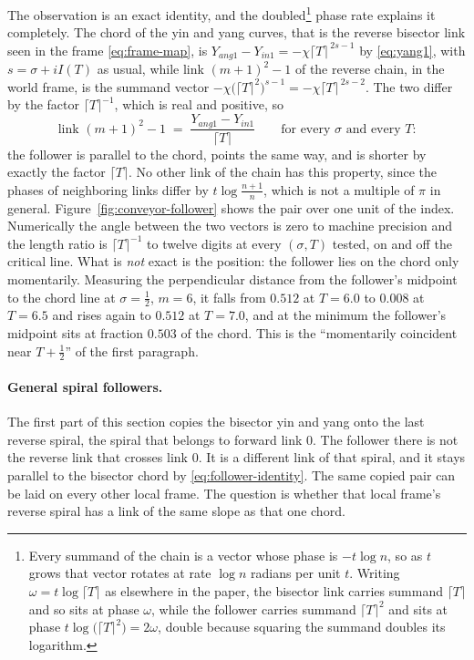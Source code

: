 \documentclass[11pt]{article}
\theoremstyle{definition}
\begin{document}
The observation is an exact identity, and the doubled\footnote{Every summand
of the chain is a vector whose phase is $-t\log n$, so as $t$ grows that
vector rotates at rate $\log n$ radians per unit $t$. Writing
$\omega=t\log\lceil T\rceil$ as elsewhere in the paper, the bisector link
carries summand $\lceil T\rceil$ and so sits at phase $\omega$, while the
follower carries summand $\lceil T\rceil^{2}$ and sits at phase
$t\log\bigl(\lceil T\rceil^{2}\bigr)=2\omega$, double because squaring the
summand doubles its logarithm.} phase rate explains it
completely. The chord of the yin and yang curves, that is the reverse bisector link
seen in the frame \eqref{eq:frame-map}, is
$Y_{ang1}-Y_{in1}=-\chi\lceil T\rceil^{\,2s-1}$ by \eqref{eq:yang1}, with
$s=\sigma+iI(T)$ as usual, while
link $(m+1)^{2}-1$ of the reverse chain, in the world frame, is the summand
vector $-\chi\bigl(\lceil T\rceil^{2}\bigr)^{s-1}=-\chi\lceil
T\rceil^{\,2s-2}$. The two differ by the factor $\lceil T\rceil^{-1}$, which
is real and positive, so
\begin{equation}\label{eq:follower-identity}
\text{link }(m+1)^2-1 \;=\; \frac{Y_{ang1}-Y_{in1}}{\lceil T\rceil}
\qquad\text{for every }\sigma\text{ and every $T$:}
\end{equation}
the follower is parallel to the chord, points the same way, and is shorter by
exactly the factor $\lceil T\rceil$. No other link of the chain has this
property, since the phases of neighboring links differ by
$t\log\frac{n+1}{n}$, which is not a multiple of $\pi$ in general.
Figure~\ref{fig:conveyor-follower} shows the pair over one unit of the index.
Numerically the angle between the two vectors is zero to machine precision and
the length ratio is $\lceil T\rceil^{-1}$ to twelve digits at every
$(\sigma,T)$ tested, on and off the critical line. What is \emph{not} exact is
the position: the follower lies on the chord only momentarily. Measuring the
perpendicular distance from the follower's midpoint to the chord line at
$\sigma=\tfrac12$, $m=6$, it falls from $0.512$ at $T=6.0$ to $0.008$ at
$T=6.5$ and rises again to $0.512$ at $T=7.0$, and at the minimum the
follower's midpoint sits at fraction $0.503$ of the chord. This is the
``momentarily coincident near $T+\tfrac12$'' of the first paragraph.

\paragraph{General spiral followers.}
The first part of this section copies the bisector yin and yang onto the
last reverse spiral, the spiral that belongs to forward link $0$. The
follower there is not the reverse link that crosses link $0$. It is a
different link of that spiral, and it stays parallel to the bisector chord
by \eqref{eq:follower-identity}. The same copied pair can be laid on every
other local frame. The question is whether that local frame's reverse spiral has
a link of the same slope as that one chord.
\end{document}
